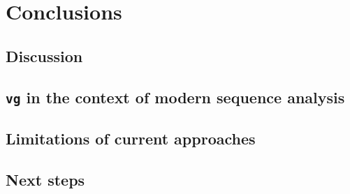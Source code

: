 %
\chapter{Conclusions}

\ifpdf
    \graphicspath{{Chapter3/Figs/Raster/}{Chapter3/Figs/PDF/}{Chapter3/Figs/}}
\else
    \graphicspath{{Chapter3/Figs/Vector/}{Chapter3/Figs/}}
\fi


\section{Discussion}
\section{{\tt vg} in the context of modern sequence analysis}
\section{Limitations of current approaches}
\section{Next steps}
